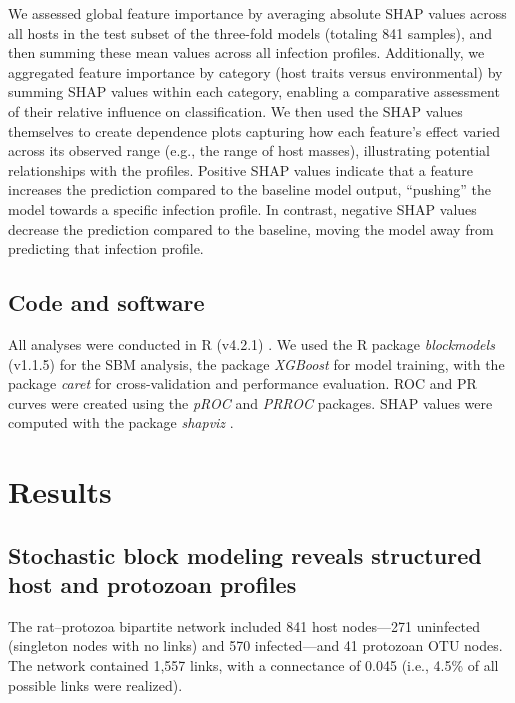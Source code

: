 \documentclass[oneside, a4paper, onecolumn, 11pt]{article}
\begin{document}
We assessed global feature importance by averaging absolute SHAP values across all hosts in the test subset of the three-fold models (totaling 841 samples), and then summing these mean values across all infection profiles. Additionally, we aggregated feature importance by category (host traits versus environmental) by summing SHAP values within each category, enabling a comparative assessment of their relative influence on classification. We then used the SHAP values themselves to create dependence plots capturing how each feature’s effect varied across its observed range (e.g., the range of host masses), illustrating potential relationships with the profiles. Positive SHAP values indicate that a feature increases the prediction compared to the baseline model output, ``pushing'' the model towards a specific infection profile. In contrast, negative SHAP values decrease the prediction compared to the baseline, moving the model away from predicting that infection profile.

\subsection*{Code and software}
All analyses were conducted in R (v4.2.1) \citep{R-Core-Team2024-fg}. We used the R package \textit{blockmodels} (v1.1.5) \citep{Leger2016-ab} for the SBM analysis, the package \textit{XGBoost} \citep{Chen2016-ev} for model training, with the package \textit{caret} \citep{Kuhn2008-kd} for cross-validation and performance evaluation. ROC and PR curves were created using the \textit{pROC} \citep{Robin2011-vr} and \textit{PRROC} \citep{Grau2015-sw} packages. SHAP values were computed with the package \textit{shapviz} \citep{Mayer2025-vk}. 

\section*{Results}

\subsection*{Stochastic block modeling reveals structured host and protozoan profiles}
The rat–protozoa bipartite network included 841 host nodes---271 uninfected (singleton nodes with no links) and 570 infected---and 41 protozoan OTU nodes. The network contained 1,557 links, with a connectance of 0.045 (i.e., 4.5\% of all possible links were realized).
\end{document}
